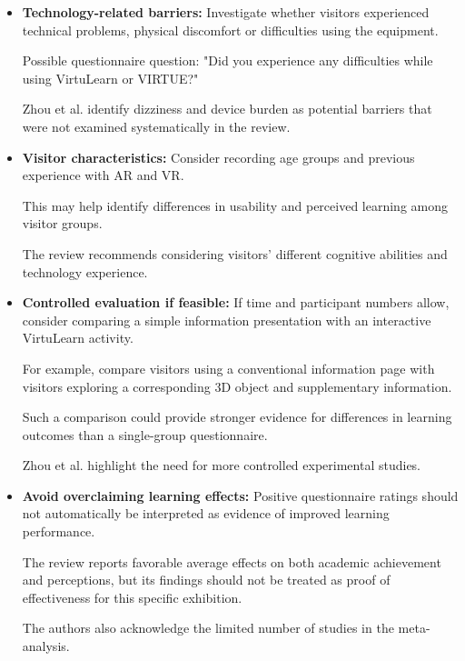 \begin{itemize}
    \item \textbf{Technology-related barriers:}
    Investigate whether visitors experienced
    technical problems, physical discomfort
    or difficulties using the equipment.

    Possible questionnaire question:
    "Did you experience any difficulties
    while using VirtuLearn or VIRTUE?"

    Zhou et al. identify dizziness and device
    burden as potential barriers that were
    not examined systematically in the review.
    \cite[p.~13]{zhou_meta-analytic_2022}

    \item \textbf{Visitor characteristics:}
    Consider recording age groups and
    previous experience with AR and VR.

    This may help identify differences
    in usability and perceived learning
    among visitor groups.

    The review recommends considering
    visitors' different cognitive abilities
    and technology experience.
    \cite[p.~13]{zhou_meta-analytic_2022}

    \item \textbf{Controlled evaluation if feasible:}
    If time and participant numbers allow,
    consider comparing a simple information
    presentation with an interactive
    VirtuLearn activity.

    For example, compare visitors using
    a conventional information page with
    visitors exploring a corresponding
    3D object and supplementary information.

    Such a comparison could provide stronger
    evidence for differences in learning
    outcomes than a single-group questionnaire.

    Zhou et al. highlight the need for
    more controlled experimental studies.
    \cite[p.~13]{zhou_meta-analytic_2022}

    \item \textbf{Avoid overclaiming learning effects:}
    Positive questionnaire ratings should not
    automatically be interpreted as evidence
    of improved learning performance.

    The review reports favorable average
    effects on both academic achievement
    and perceptions, but its findings
    should not be treated as proof of
    effectiveness for this specific exhibition.

    The authors also acknowledge the limited
    number of studies in the meta-analysis.
    \cite[pp.~11--13]{zhou_meta-analytic_2022}

\end{itemize}



